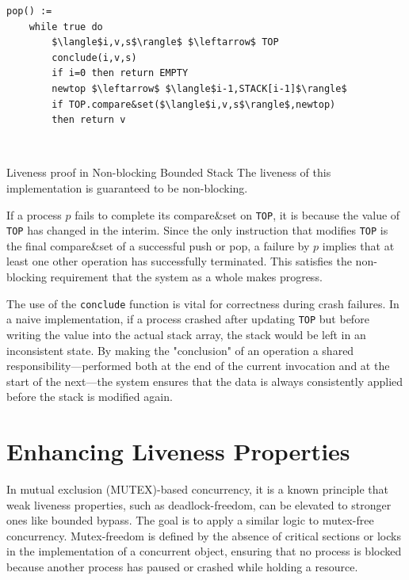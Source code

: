 \begin{itemize}
\begin{minipage}{\textwidth}
\begin{lstlisting}[mathescape]
pop() :=
    while true do
        $\langle$i,v,s$\rangle$ $\leftarrow$ TOP
        conclude(i,v,s)
        if i=0 then return EMPTY
        newtop $\leftarrow$ $\langle$i-1,STACK[i-1]$\rangle$
        if TOP.compare&set($\langle$i,v,s$\rangle$,newtop)
        then return v
\end{lstlisting}
\end{minipage}\\
\end{itemize}

\begin{Thm}{Liveness proof in Non-blocking Bounded Stack}{}
    The liveness of this implementation is guaranteed to be non-blocking. 

    \begin{demonstration}
    If a process $p$ fails to complete its compare\&set on \texttt{TOP}, it is because the value of \texttt{TOP} has changed in the interim. Since the only instruction that modifies \texttt{TOP} is the final compare\&set of a successful push or pop, a failure by $p$ implies that at least one other operation has successfully terminated. This satisfies the non-blocking requirement that the system as a whole makes progress.

    The use of the \texttt{conclude} function is vital for correctness during crash failures. In a naive implementation, if a process crashed after updating \texttt{TOP} but before writing the value into the actual stack array, the stack would be left in an inconsistent state. By making the "conclusion" of an operation a shared responsibility—performed both at the end of the current invocation and at the start of the next—the system ensures that the data is always consistently applied before the stack is modified again.
    \end{demonstration}
\end{Thm}

\section{Enhancing Liveness Properties}
In mutual exclusion (MUTEX)-based concurrency, it is a known principle that weak liveness properties, such as deadlock-freedom, can be elevated to stronger ones like bounded bypass. The goal is to apply a similar logic to mutex-free concurrency. Mutex-freedom is defined by the absence of critical sections or locks in the implementation of a concurrent object, ensuring that no process is blocked because another process has paused or crashed while holding a resource.

